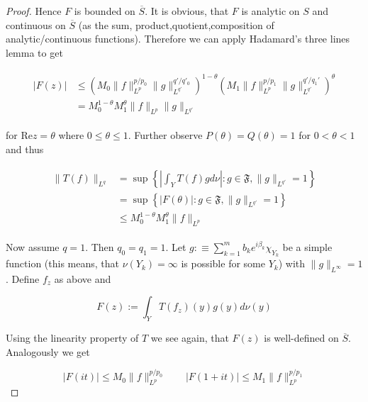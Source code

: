\begin{proof}
		
		Hence $F$ is bounded on $\overline{S}$. It is obvious, that $F$ is analytic on $S$ and continuous on $\overline{S}$ (as the sum, product,quotient,composition of analytic/continuous functions). Therefore we can apply Hadamard's three lines lemma to get

		\begin{gather}
			\begin{aligned}
				\vert F(z) \vert &\leqslant \left( M_0  \|f\|_{L^p}^{p/p_0} \|g\|_{L^{q'}}^{q'/q'_0} \right)^{1 - \theta}\left(  M_1 \|f\|_{L^p}^{p/p_1}\|g\|_{L^{q'}}^{q'/q_1'} \right)^\theta\\
			&= M_0^{1 - \theta}M_1^\theta \|f\|_{L^p}\|g\|_{L^{q'}}
			\label{est:F}
		\end{aligned}
		\end{gather}

		for $\mathrm{Re}z = \theta$ where $0 \leqslant \theta \leqslant 1$. Further observe $P(\theta) = Q(\theta) = 1$ for $0 < \theta < 1$ and thus 
		
		\begin{gather}
			\begin{aligned}
				\|T(f)\|_{L^q} &= \sup\left\{\left\vert \int_Y T(f)gd\nu\right\vert : g \in \mathfrak{F}, \|g\|_{L^{q'}} = 1\right\}\\
				&=  \sup\left\{\left\vert F(\theta)\right\vert : g \in \mathfrak{F}, \|g\|_{L^{q'}} = 1\right\}\\
				&\leqslant M_0^{1 - \theta}M_1^\theta \|f\|_{L^p}
				\label{id:F}
			\end{aligned}
		\end{gather}

		Now assume \underline{$q = 1$}. Then $q_0 = q_1 = 1$. Let $g :\equiv \sum_{k = 1}^m b_k e^{i\beta_k}\chi_{Y_k}$ be a simple function (this means, that $\nu(Y_k) = \infty$ is possible for some $Y_k$) with $\|g\|_{L^{\infty}} = 1$. Define $f_z$ as above and

		\begin{equation}
			F(z) := \int_Y T(f_z)(y)g(y)d\nu(y)	
		\end{equation}

		Using the linearity property of $T$ we see again, that $F(z)$ is well-defined on $\overline{S}$. Analogously we get 

		\begin{equation}
			\vert F(it)\vert \leqslant M_0 \|f\|_{L^p}^{p/p_0} \qquad \vert F(1 + it) \vert \leqslant M_1 \|f\|_{L^p}^{p/p_1}
		\end{equation}


\end{proof}
